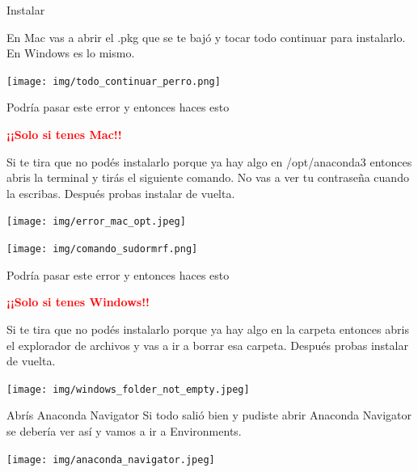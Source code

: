 \documentclass{beamer}
\begin{document}
\begin{frame}{Instalar}
    \begin{center}
        En Mac vas a abrir el .pkg que se te bajó y tocar todo continuar para instalarlo. En Windows es lo mismo.
        
        \texttt{[image: img/todo\_continuar\_perro.png]}
    \end{center}
\end{frame}

\begin{frame}{Podría pasar este error y entonces haces esto}
    \begin{center}
        \textcolor{red}{\textbf{¡¡Solo si tenes Mac!!}}
    \end{center}
    Si te tira que no podés instalarlo porque ya hay algo en /opt/anaconda3 entonces abris la terminal y tirás el siguiente comando. No vas a ver tu contraseña cuando la escribas. Después probas instalar de vuelta.

    \begin{center}
        \begin{minipage}{0.48\textwidth}
            \centering
            \texttt{[image: img/error\_mac\_opt.jpeg]}
        \end{minipage}
        \hfill
        \begin{minipage}{0.48\textwidth}
            \centering
            \texttt{[image: img/comando\_sudormrf.png]}
        \end{minipage}
    \end{center}
\end{frame}

\begin{frame}{Podría pasar este error y entonces haces esto}
    \begin{center}
        \textcolor{red}{\textbf{¡¡Solo si tenes Windows!!}}
    \end{center}
    Si te tira que no podés instalarlo porque ya hay algo en la carpeta entonces abris el explorador de archivos y vas a ir a borrar esa carpeta. Después probas instalar de vuelta.

    \begin{center}
        \texttt{[image: img/windows\_folder\_not\_empty.jpeg]}
    \end{center}
\end{frame}

\begin{frame}{Abrís Anaconda Navigator}
    Si todo salió bien y pudiste abrir Anaconda Navigator se debería ver así y vamos a ir a Environments.
    \begin{center}
        \texttt{[image: img/anaconda\_navigator.jpeg]}
    \end{center}
\end{frame}
\end{document}
